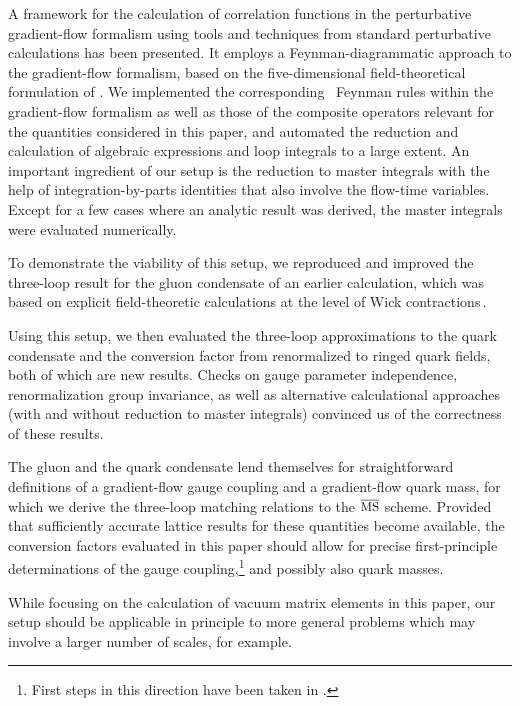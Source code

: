 \label{sec:conclusions}

A framework for the calculation of correlation functions in the
perturbative gradient-flow formalism using tools and techniques from
standard perturbative  calculations has been presented. It
employs a Feynman-diagrammatic approach to the gradient-flow formalism,
based on the five-dimensional field-theoretical formulation of
. We implemented the corresponding \qcd\ Feynman
rules within the gradient-flow formalism as well as those of the
composite operators relevant for the quantities considered in this
paper, and automated the reduction and calculation of algebraic
expressions and loop integrals to a large extent. An important
ingredient of our setup is the reduction to master integrals with the
help of integration-by-parts identities that also involve the flow-time
variables. Except for a few cases where an analytic result was derived,
the master integrals were evaluated numerically.

To demonstrate the viability of this setup, we reproduced and improved
the three-loop result for the gluon condensate of an earlier
calculation, which was based on explicit field-theoretic calculations at
the level of Wick contractions\,\cite{Harlander:2016vzb}.

Using this setup, we then evaluated the three-loop approximations to the
quark condensate and the conversion factor from \msbar{} renormalized to
ringed quark fields, both of which are new results. Checks on gauge
parameter independence, renormalization group invariance, as well as
alternative calculational approaches (with and without reduction to
master integrals) convinced us of the correctness of these results.

The gluon and the quark condensate lend themselves for straightforward
definitions of a gradient-flow gauge coupling and a gradient-flow
quark mass, for which we derive the three-loop matching relations to the
$\overline{\mbox{{\small MS}}}$ scheme. Provided that sufficiently accurate lattice results for
these quantities become available, the conversion factors evaluated in
this paper should allow for precise first-principle determinations of
the gauge coupling,\footnote{First steps in this direction have been
  taken in .} and possibly also quark masses.

While focusing on the calculation of vacuum matrix elements in this
paper, our setup should be applicable in principle to more general
problems which may involve a larger number of scales, for example.

